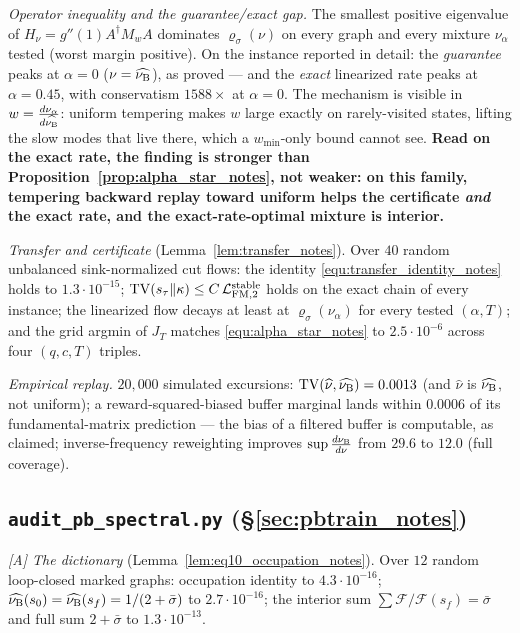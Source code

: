 \documentclass[11pt]{article}
\theoremstyle{definition}
\theoremstyle{remark}
\def\lambda{\widehat\nuB}
\begin{document}
\emph{Operator inequality and the guarantee/exact gap.} The smallest positive eigenvalue
of $H_\nu=g''(1)A^\dagger M_wA$ dominates $\varrho_\sigma(\nu)$ on every graph and every
mixture $\nu_\alpha$ tested (worst margin positive). On the instance reported in detail:
the \emph{guarantee} peaks at $\alpha=0$ ($\nu=\lambda$), as proved --- and the
\emph{exact} linearized rate peaks at $\alpha=0.45$, with conservatism $1588\times$ at
$\alpha=0$. The mechanism is visible in $w=\frac{d\nu_\alpha}{d\lambda}$: uniform
tempering makes $w$ large exactly on rarely-visited states, lifting the slow modes that
live there, which a $w_{\min}$-only bound cannot see. \textbf{Read on the exact rate,
the finding is stronger than Proposition~\ref{prop:alpha_star_notes}, not weaker: on this
family, tempering backward replay toward uniform helps the certificate \emph{and} the
exact rate, and the exact-rate-optimal mixture is interior.}

\emph{Transfer and certificate} (Lemma~\ref{lem:transfer_notes}). Over $40$ random unbalanced
sink-normalized cut flows: the identity \eqref{equ:transfer_identity_notes} holds to
$1.3\cdot10^{-15}$; $\mathrm{TV}(s_\tau\|\kappa)\leq C\,\mathcal L_{\mathrm{FM},2}^{\mathrm{stable}}$ holds on the exact chain of
every instance; the linearized flow decays at least at $\varrho_\sigma(\nu_\alpha)$ for
every tested $(\alpha,T)$; and the grid argmin of $J_T$ matches
\eqref{equ:alpha_star_notes} to $2.5\cdot10^{-6}$ across four $(q,c,T)$ triples.

\emph{Empirical replay.} $20{,}000$ simulated excursions: $\TV(\widehat\nu,\lambda)=0.0013$
(and $\widehat\nu$ is $\lambda$, not uniform); a reward-squared-biased buffer marginal
lands within $0.0006$ of its fundamental-matrix prediction --- the bias of a filtered
buffer is computable, as claimed; inverse-frequency reweighting improves
$\sup\frac{d\nu_{\mathrm{B}}}{d\nu}$ from $29.6$ to $12.0$ (full coverage).

\subsection{\texttt{audit\_pb\_spectral.py} (\S\ref{sec:pbtrain_notes})}\label{sec:num_pb_notes}

\emph{[A] The dictionary} (Lemma~\ref{lem:eq10_occupation_notes}). Over $12$ random
loop-closed marked graphs: occupation identity to $4.3\cdot10^{-16}$;
$\lambda(s_0)=\lambda(s_f)=1/(2+\bar\sigma)$ to $2.7\cdot10^{-16}$; the interior sum
$\sum\mathcal F/\mathcal F(s_f)=\bar\sigma$ and full sum $2+\bar\sigma$ to
$1.3\cdot10^{-13}$.
\end{document}

